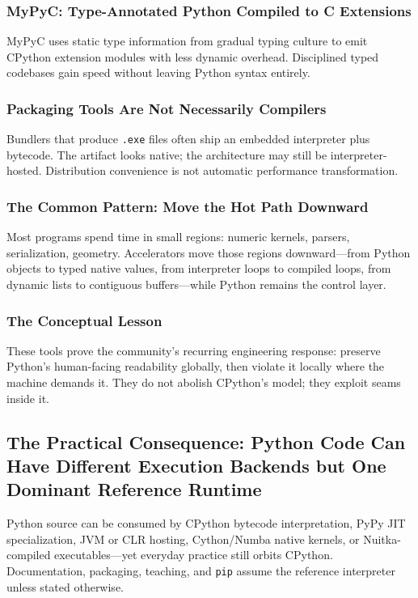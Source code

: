 \documentclass[a4paper,twoside]{report}
\begin{document}
\subsubsection{MyPyC: Type-Annotated Python Compiled to C Extensions}

MyPyC uses static type information from gradual typing culture to emit CPython extension modules with less dynamic overhead. Disciplined typed codebases gain speed without leaving Python syntax entirely.

\subsubsection{Packaging Tools Are Not Necessarily Compilers}

Bundlers that produce \texttt{.exe} files often ship an embedded interpreter plus bytecode. The artifact looks native; the architecture may still be interpreter-hosted. Distribution convenience is not automatic performance transformation.

\subsubsection{The Common Pattern: Move the Hot Path Downward}

Most programs spend time in small regions: numeric kernels, parsers, serialization, geometry. Accelerators move those regions downward---from Python objects to typed native values, from interpreter loops to compiled loops, from dynamic lists to contiguous buffers---while Python remains the control layer.

\subsubsection{The Conceptual Lesson}

These tools prove the community's recurring engineering response: preserve Python's human-facing readability globally, then violate it locally where the machine demands it. They do not abolish CPython's model; they exploit seams inside it.


\subsection{The Practical Consequence: Python Code Can Have Different Execution Backends but One Dominant Reference Runtime}

Python source can be consumed by CPython bytecode interpretation, PyPy JIT specialization, JVM or CLR hosting, Cython/Numba native kernels, or Nuitka-compiled executables---yet everyday practice still orbits CPython. Documentation, packaging, teaching, and \texttt{pip} assume the reference interpreter unless stated otherwise.
\end{document}
